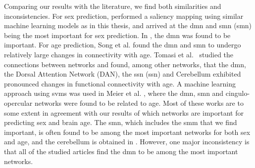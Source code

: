 Comparing our results with the literature, we find both similarities and inconsistencies. For sex prediction, \cite{understanding_gnn} performed a saliency mapping using similar machine learning models as in this thesis, and arrived at the \acrshort{dmn} and \acrlong{smn} (\acrshort{smn}) being the most important for sex prediction. In \cite{arslan}, the \acrshort{dmn} was found to be important. For age prediction, Song et al. \cite{song_reorganizational} found the \acrshort{dmn} and \acrshort{smn} to undergo relatively large changes in connectivity with age. Tomasi et al.\ \cite{tomasi_aging} studied the connections between networks and found, among other networks, that the \acrshort{dmn}, the Dorsal Attention Network (DAN), the \acrlong{ssn} (\acrshort{ssn}) and Cerebellum exhibited pronounced changes in functional connectivity with age. A machine learning approach using \acrshort{svm}s was used in Meier et al. \cite{meier_svm}, where the \acrshort{dmn}, \acrshort{smn} and cingulo-opercular networks were found to be related to age. Most of these works are to some extent in agreement with our results of which networks are important for predicting sex and brain age. The \acrshort{smn}, which includes the \acrshort{smm} that we find important, is often found to be among the most important networks for both sex and age, and the cerebellum is obtained in \cite{tomasi_aging}. However, one major inconsistency is that all of the studied articles find the \acrshort{dmn} to be among the most important networks. 

